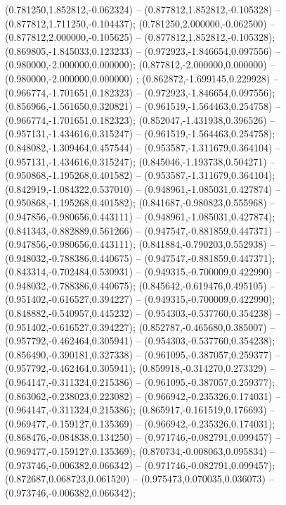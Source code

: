  (0.781250,1.852812,-0.062324) -- (0.877812,1.852812,-0.105328) -- (0.877812,1.711250,-0.104437);
 (0.781250,2.000000,-0.062500) -- (0.877812,2.000000,-0.105625) -- (0.877812,1.852812,-0.105328);
 (0.869805,-1.845033,0.123233) -- (0.972923,-1.846654,0.097556) -- (0.980000,-2.000000,0.000000);
 (0.877812,-2.000000,0.000000) -- (0.980000,-2.000000,0.000000) ;
 (0.862872,-1.699145,0.229928) -- (0.966774,-1.701651,0.182323) -- (0.972923,-1.846654,0.097556);
 (0.856966,-1.561650,0.320821) -- (0.961519,-1.564463,0.254758) -- (0.966774,-1.701651,0.182323);
 (0.852047,-1.431938,0.396526) -- (0.957131,-1.434616,0.315247) -- (0.961519,-1.564463,0.254758);
 (0.848082,-1.309464,0.457544) -- (0.953587,-1.311679,0.364104) -- (0.957131,-1.434616,0.315247);
 (0.845046,-1.193738,0.504271) -- (0.950868,-1.195268,0.401582) -- (0.953587,-1.311679,0.364104);
 (0.842919,-1.084322,0.537010) -- (0.948961,-1.085031,0.427874) -- (0.950868,-1.195268,0.401582);
 (0.841687,-0.980823,0.555968) -- (0.947856,-0.980656,0.443111) -- (0.948961,-1.085031,0.427874);
 (0.841343,-0.882889,0.561266) -- (0.947547,-0.881859,0.447371) -- (0.947856,-0.980656,0.443111);
 (0.841884,-0.790203,0.552938) -- (0.948032,-0.788386,0.440675) -- (0.947547,-0.881859,0.447371);
 (0.843314,-0.702484,0.530931) -- (0.949315,-0.700009,0.422990) -- (0.948032,-0.788386,0.440675);
 (0.845642,-0.619476,0.495105) -- (0.951402,-0.616527,0.394227) -- (0.949315,-0.700009,0.422990);
 (0.848882,-0.540957,0.445232) -- (0.954303,-0.537760,0.354238) -- (0.951402,-0.616527,0.394227);
 (0.852787,-0.465680,0.385007) -- (0.957792,-0.462464,0.305941) -- (0.954303,-0.537760,0.354238);
 (0.856490,-0.390181,0.327338) -- (0.961095,-0.387057,0.259377) -- (0.957792,-0.462464,0.305941);
 (0.859918,-0.314270,0.273329) -- (0.964147,-0.311324,0.215386) -- (0.961095,-0.387057,0.259377);
 (0.863062,-0.238023,0.223082) -- (0.966942,-0.235326,0.174031) -- (0.964147,-0.311324,0.215386);
 (0.865917,-0.161519,0.176693) -- (0.969477,-0.159127,0.135369) -- (0.966942,-0.235326,0.174031);
 (0.868476,-0.084838,0.134250) -- (0.971746,-0.082791,0.099457) -- (0.969477,-0.159127,0.135369);
 (0.870734,-0.008063,0.095834) -- (0.973746,-0.006382,0.066342) -- (0.971746,-0.082791,0.099457);
 (0.872687,0.068723,0.061520) -- (0.975473,0.070035,0.036073) -- (0.973746,-0.006382,0.066342);
